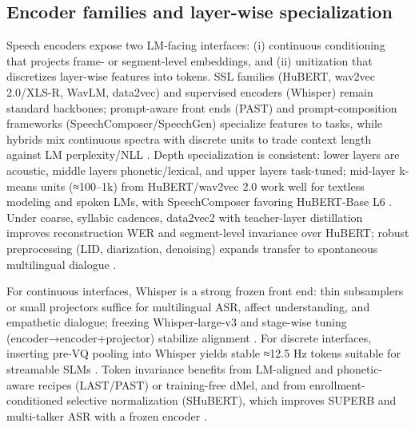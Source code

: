 \subsection{Encoder families and layer-wise specialization} \label{subsec:Encoder families and layer-wise specialization}
Speech encoders expose two LM-facing interfaces: (i) continuous conditioning that projects frame- or segment-level embeddings, and (ii) unitization that discretizes layer-wise features into tokens. SSL families (HuBERT, wav2vec 2.0/XLS-R, WavLM, data2vec) and supervised encoders (Whisper) remain standard backbones; prompt-aware front ends (PAST) and prompt-composition frameworks (SpeechComposer/SpeechGen) specialize features to tasks, while hybrids mix continuous spectra with discrete units to trade context length against LM perplexity/NLL \cite{har-tuv2025pastphoneticacousticspeechtokenizer,wu2024speechcomposerunifyingmultiplespeechtask,wu2023speechgenunlockinggenerativepowerspeechl,verma2024whispergpthybridrepresentationaudiolarge}. Depth specialization is consistent: lower layers are acoustic, middle layers phonetic/lexical, and upper layers task-tuned; mid-layer k-means units (≈100–1k) from HuBERT/wav2vec 2.0 work well for textless modeling and spoken LMs, with SpeechComposer favoring HuBERT-Base L6 \cite{hsu2024exploringcontextlearningtextlessspeechla,wu2024speechcomposerunifyingmultiplespeechtask}. Under coarse, syllabic cadences, data2vec2 with teacher-layer distillation improves reconstruction WER and segment-level invariance over HuBERT; robust preprocessing (LID, diarization, denoising) expands transfer to spontaneous multilingual dialogue \cite{baade2024syllablelmlearningcoarsesemanticunitsspe,nakata2024jchatjapaneselargescalespokendialoguecor}.

For continuous interfaces, Whisper is a strong frozen front end: thin subsamplers or small projectors suffice for multilingual ASR, affect understanding, and empathetic dialogue; freezing Whisper-large-v3 and stage-wise tuning (encoder→encoder+projector) stabilize alignment \cite{wang2024blspemotowardsempatheticlargespeechlangu,li2025transsionmultilingualspeechrecognitionsy,nguyen2025qwenvsgemmaintegrationwhispercomparative}. For discrete interfaces, inserting pre-VQ pooling into Whisper yields stable ≈12.5 Hz tokens suitable for streamable SLMs \cite{zeng2024scalingspeechtextpretrainingsyntheticint}. Token invariance benefits from LM-aligned and phonetic-aware recipes (LAST/PAST) or training-free dMel, and from enrollment-conditioned selective normalization (SHuBERT), which improves SUPERB and multi-talker ASR with a frozen encoder \cite{turetzky2024lastlanguagemodelawarespeechtokenization,har-tuv2025pastphoneticacousticspeechtokenizer,bai2025dmelspeechtokenizationmadesimple,entry2025selectivehubertselfsupervisedpretraining}.

